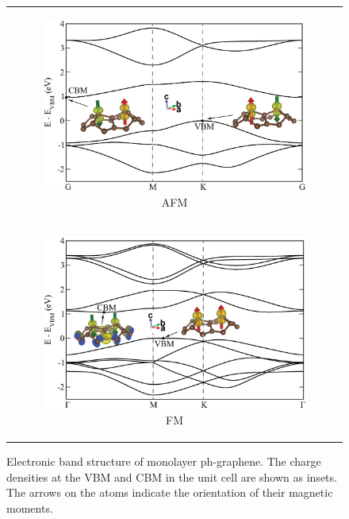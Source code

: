 \begin{figure}[htb]
\centering
  \begin{tabular}{c}
  \begin{subfigure}{0.7\textwidth}
    \includegraphics[width=\textwidth]{PG_band-AFM.eps}%
    \caption{AFM}
  \end{subfigure} \\
  \begin{subfigure}{0.7\textwidth}
    \includegraphics[width=\textwidth]{PG_band-FM.eps}%
    \caption{FM}
  \end{subfigure}    
  \end{tabular}
\caption{Electronic band structure of monolayer ph-graphene. The charge densities at the VBM and CBM in the unit cell are shown as insets. The arrows on the atoms indicate the orientation of their magnetic moments.\label{electronic} }
\end{figure}


